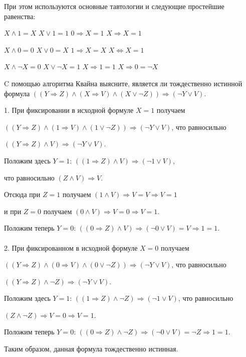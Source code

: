 При этом используются основные тавтологии и следующие простейшие равенства:

$X\land1 = X$ \qquad $X\lor 1 = 1$ \qquad $0\Rightarrow X = 1$ \qquad $X\Rightarrow X = 1$

$X\land 0 = 0$ \qquad $X\lor 0 = X$ \qquad $1\Rightarrow X = X$ \qquad $X\Leftrightarrow X = 1$

$X\land\lnot X = 0$ \quad $X\lor\lnot X = 1$ \qquad $X\Rightarrow 1 = 1$  \qquad $X\Rightarrow 0 = \lnot X$

\begin{example}
    C помощью алгоритма Квайна выясните, является ли тождественно истинной формула
    $((Y\Rightarrow Z)\land(X\Rightarrow V)\land(X\lor\lnot Z))\Rightarrow(\lnot Y \lor V)$.

    1. При фиксировании в исходной формуле $X = 1$ получаем 
    
    $((Y\Rightarrow Z)\land(1\Rightarrow V)\land(1\lor\lnot Z))\Rightarrow(\lnot Y \lor V)$, что равносильно 
    
    $((Y\Rightarrow Z)\land V)\Rightarrow (\lnot Y\lor V)$.

    Положим здесь $Y = 1$: $((1\Rightarrow Z)\land V)\Rightarrow (\lnot 1\lor V)$, 
    
    что равносильно $(Z\land V)\Rightarrow V$.

    Отсюда при $Z = 1$ получаем $(1\land V)\Rightarrow V = V \Rightarrow V = 1$

    и при $Z = 0$ получаем $(0\land V)\Rightarrow V = 0 \Rightarrow V = 1$.

    Положим теперь $Y = 0$: $((0\Rightarrow Z)\land V)\Rightarrow(\lnot 0 \lor V) = V \Rightarrow 1 = 1$.
\\ \\
    2. При фиксированном в исходной формуле $X = 0$ получаем 

    $((Y\Rightarrow Z)\land(0\Rightarrow V)\land(0\lor\lnot Z))\Rightarrow(\lnot Y \lor V)$, что равносильно 
    
    $((Y\Rightarrow Z)\land\lnot Z) \Rightarrow (\lnot Y \lor V)$.

    Положим здесь $Y = 1$: $((1\Rightarrow Z)\land\lnot Z)\Rightarrow(\lnot 1 \lor V)$, что равносильно 
    
    $(Z\land\lnot Z)\Rightarrow V = 0 \Rightarrow V = 1$.

    Положим теперь $Y = 0$: $((0\Rightarrow Z)\land\lnot Z)\Rightarrow(\lnot 0\lor V)=\lnot Z \Rightarrow 1 = 1$.

    Таким образом, данная формула тождественно истинная.
\end{example}


